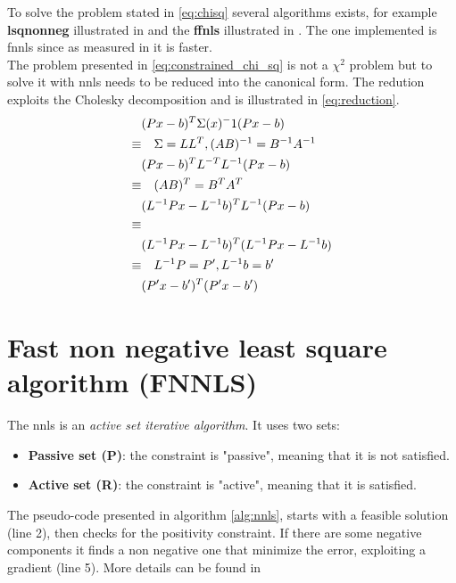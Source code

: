 To solve the problem stated in \ref{eq:chisq} several algorithms exists, for example \textbf{lsqnonneg} illustrated in \cite{nnls} and the \textbf{ffnls} illustrated in \cite{fnnls}. The one implemented is fnnls since as measured in \cite{Chen09nonnegativityconstraints} it is faster.\\
The problem presented in \ref{eq:constrained_chi_sq} is not a $\chi^2$ problem but to solve it with nnls needs to be reduced into the canonical form. The redution exploits the Cholesky decomposition and is illustrated in \ref{eq:reduction}.
\begin{equation}\label{eq:reduction}
  \begin{split}
  & (Px-b)^T\Sigma(x)^-1(Px-b)\\
  \equiv &\quad \Sigma=LL^T,\space (AB)^{-1} = B^{-1} A^{-1}\\
  & (Px-b)^T L^{-T} L^{-1} (Px-b)\\
  \equiv &\quad (AB)^T = B^T A^T \\
  & (L^{-1}Px-L^{-1}b)^T  L^{-1} (Px-b)\\
  \equiv & \\
  & (L^{-1}Px-L^{-1}b)^T (L^{-1}Px-L^{-1}b)\\
  \equiv &\quad L^{-1}P=P', \space L^{-1}b=b' \\
  & (P'x-b')^T(P'x-b')\\
  \end{split}
\end{equation}

\section{Fast non negative least square algorithm (FNNLS)}
The nnls is an \textit{active set iterative algorithm}. It uses two sets: 
\begin{itemize}   
\item \textbf{Passive set (P)}: the constraint is "passive", meaning that it is not satisfied.   
\item \textbf{Active set (R)}:  the constraint is "active", meaning that it is satisfied.   
\end{itemize}   
The pseudo-code presented in algorithm \ref{alg:nnls}, starts with a feasible solution (line 2), then checks for the positivity constraint. If there are some negative components it finds a non negative one that minimize the error, exploiting a gradient (line 5). More details can be found in \cite{nnls}

